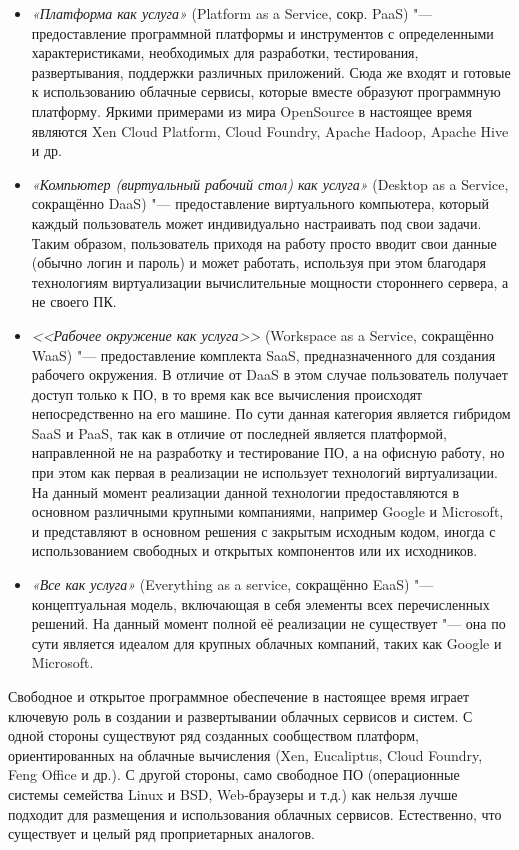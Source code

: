 \documentclass[a5paper,10pt]{article}
\begin{document}
\begin{itemize}
\item \emph{«Платформа как услуга»} (Platform as a Service, сокр. PaaS) "--- предоставление программной платформы и инструментов с определенными характеристиками, необходимых для разработки, тестирования, развертывания, поддержки различных приложений. Сюда же входят и готовые к использованию облачные сервисы, которые вместе образуют программную платформу. Яркими примерами из мира OpenSource в настоящее время являются Xen Cloud Platform, Cloud Foundry, Apache Hadoop, Apache Hive и др.
\item \emph{«Компьютер (виртуальный рабочий стол) как услуга»} (Desk\-top as a Service, сокращённо DaaS) "--- предоставление виртуального компьютера, который каждый пользователь может индивидуально настраивать под свои задачи. Таким образом, пользователь приходя на работу просто вводит свои данные (обычно логин и пароль) и может работать, используя при этом благодаря технологиям виртуализации вычислительные мощности стороннего сервера, а не своего ПК. 
\item \emph{<<Рабочее окружение как услуга>>} (Workspace as a Service, сокращённо WaaS) "--- предоставление комплекта  SaaS, предназначенного для создания рабочего окружения. В отличие от DaaS в этом случае пользователь получает доступ только к ПО, в то время как все вычисления происходят непосредственно на его машине. По сути данная категория является гибридом SaaS и PaaS, так как в отличие от последней является платформой, направленной не на разработку и тестирование ПО, а на офисную работу, но при этом как первая в реализации не использует технологий виртуализации. На данный момент реализации данной технологии предоставляются в основном различными крупными компаниями, например Google и Microsoft, и представляют в основном решения с закрытым исходным кодом, иногда с использованием свободных и открытых компонентов или их исходников.
\item \emph{«Все как услуга»} (Everything as a service, сокращённо EaaS) "--- концептуальная модель, включающая в себя элементы всех перечисленных решений. На данный момент полной её реализации не существует "--- она по сути является идеалом для крупных облачных компаний, таких как Google и Microsoft.
\end{itemize}

Свободное и открытое программное обеспечение в настоящее время играет ключевую роль в создании и развертывании облачных сервисов и систем. С одной стороны существуют ряд созданных сообществом платформ, ориентированных на облачные вычисления (Xen, Eucaliptus, Cloud Foundry, Feng Office и др.). С другой стороны, само свободное ПО (операционные системы семейства Linux и BSD, Web-браузеры и т.д.) как нельзя лучше подходит для размещения и использования облачных сервисов.  Естественно, что существует и целый ряд проприетарных аналогов. 
\end{document}
